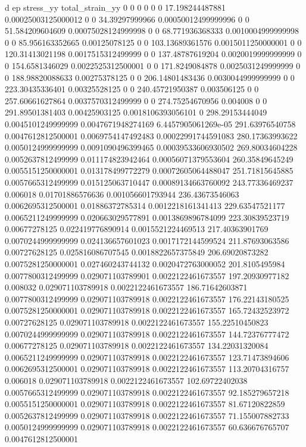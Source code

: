 d ep stress_yy total_strain_yy
0 0 0 0
0 0 17.198244487881 0.00025003125000012
0 0 34.39297999966 0.00050012499999996
0 0 51.584209604609 0.00075028124999998
0 0 68.771936368333 0.0010004999999998
0 0 85.956163352665 0.00125078125
0 0 103.13689361576 0.0015011250000001
0 0 120.31413021198 0.0017515312499999
0 0 137.48787619204 0.0020019999999999
0 0 154.6581346029 0.0022525312500001
0 0 171.8249084878 0.0025031249999999
0 0 188.98820088633 0.00275378125
0 0 206.14801483436 0.0030044999999999
0 0 223.30435336401 0.00325528125
0 0 240.45721950387 0.003506125
0 0 257.60661627864 0.0037570312499999
0 0 274.75254670956 0.004008
0 0 291.89501381403 0.00425903125
0.0018106393056101 0 298.29153444049 0.0045101249999999
0.0047671948274169 6.4457905061269e-05 291.63976540758 0.0047612812500001
0.0069754147492483 0.00022991744591083 280.17363993622 0.0050124999999999
0.0091090496399465 0.00039533606930502 269.80034604228 0.0052637812499999
0.011174823942464 0.00056071379553604 260.35849645249 0.0055151250000001
0.013178499772279 0.00072605064488047 251.71815645885 0.0057665312499999
0.015125063710447 0.00089134663760092 243.77336469237 0.006018
0.01701886576636 0.001056601793944 236.43673546063 0.0062695312500001
0.01886372785314 0.0012218161341413 229.63547521177 0.0065211249999999
0.020663029577891 0.0013869896784099 223.30839523719 0.00677278125
0.022419776890914 0.0015521224469513 217.40363901769 0.0070244999999999
0.024136657601023 0.0017172144599524 211.87693063586 0.00727628125
0.025816086707545 0.0018822657375849 206.69020873282 0.0075281250000001
0.027460243744132 0.0020472763000052 201.8105495984 0.0077800312499999
0.029071103789901 0.0022122461673557 197.20930977182 0.008032
0.029071103789918 0.0022122461673557 186.71642603871 0.0077800312499999
0.029071103789918 0.0022122461673557 176.22143180525 0.0075281250000001
0.029071103789918 0.0022122461673557 165.72432523972 0.00727628125
0.029071103789918 0.0022122461673557 155.22510450823 0.0070244999999999
0.029071103789918 0.0022122461673557 144.72376777472 0.00677278125
0.029071103789918 0.0022122461673557 134.22031320084 0.0065211249999999
0.029071103789918 0.0022122461673557 123.71473894606 0.0062695312500001
0.029071103789918 0.0022122461673557 113.20704316757 0.006018
0.029071103789918 0.0022122461673557 102.69722402038 0.0057665312499999
0.029071103789918 0.0022122461673557 92.185279657218 0.0055151250000001
0.029071103789918 0.0022122461673557 81.67120822859 0.0052637812499999
0.029071103789918 0.0022122461673557 71.155007882733 0.0050124999999999
0.029071103789918 0.0022122461673557 60.636676765707 0.0047612812500001
